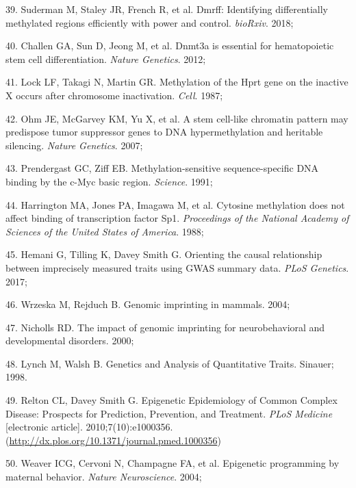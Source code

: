 \documentclass[11pt,oneside]{bristolthesis}
\newenvironment{cslreferences}%
  {}%
  {\par}
\begin{document}
\begin{cslreferences}
\leavevmode\hypertarget{ref-Suderman2018}{}%
39. Suderman M, Staley JR, French R, et al. Dmrff: Identifying differentially methylated regions efficiently with power and control. \emph{bioRxiv}. 2018;

\leavevmode\hypertarget{ref-Challen2012}{}%
40. Challen GA, Sun D, Jeong M, et al. Dnmt3a is essential for hematopoietic stem cell differentiation. \emph{Nature Genetics}. 2012;

\leavevmode\hypertarget{ref-Lock1987}{}%
41. Lock LF, Takagi N, Martin GR. Methylation of the Hprt gene on the inactive X occurs after chromosome inactivation. \emph{Cell}. 1987;

\leavevmode\hypertarget{ref-Ohm2007}{}%
42. Ohm JE, McGarvey KM, Yu X, et al. A stem cell-like chromatin pattern may predispose tumor suppressor genes to DNA hypermethylation and heritable silencing. \emph{Nature Genetics}. 2007;

\leavevmode\hypertarget{ref-Prendergast1991}{}%
43. Prendergast GC, Ziff EB. Methylation-sensitive sequence-specific DNA binding by the c-Myc basic region. \emph{Science}. 1991;

\leavevmode\hypertarget{ref-Harrington1988}{}%
44. Harrington MA, Jones PA, Imagawa M, et al. Cytosine methylation does not affect binding of transcription factor Sp1. \emph{Proceedings of the National Academy of Sciences of the United States of America}. 1988;

\leavevmode\hypertarget{ref-Hemani2017}{}%
45. Hemani G, Tilling K, Davey Smith G. Orienting the causal relationship between imprecisely measured traits using GWAS summary data. \emph{PLoS Genetics}. 2017;

\leavevmode\hypertarget{ref-Wrzeska2004}{}%
46. Wrzeska M, Rejduch B. Genomic imprinting in mammals. 2004;

\leavevmode\hypertarget{ref-Nicholls2000}{}%
47. Nicholls RD. The impact of genomic imprinting for neurobehavioral and developmental disorders. 2000;

\leavevmode\hypertarget{ref-Lynch1998}{}%
48. Lynch M, Walsh B. Genetics and Analysis of Quantitative Traits. Sinauer; 1998.

\leavevmode\hypertarget{ref-Relton2010}{}%
49. Relton CL, Davey Smith G. Epigenetic Epidemiology of Common Complex Disease: Prospects for Prediction, Prevention, and Treatment. \emph{PLoS Medicine} {[}electronic article{]}. 2010;7(10):e1000356. (\url{http://dx.plos.org/10.1371/journal.pmed.1000356})

\leavevmode\hypertarget{ref-Weaver2004}{}%
50. Weaver ICG, Cervoni N, Champagne FA, et al. Epigenetic programming by maternal behavior. \emph{Nature Neuroscience}. 2004;


\end{cslreferences}
\end{document}
